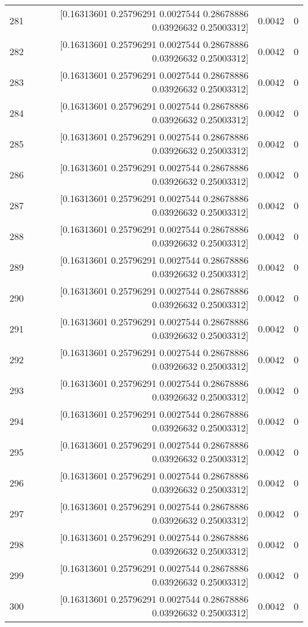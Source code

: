 \begin{longtable}{lrrr}
281 & [0.16313601 0.25796291 0.0027544  0.28678886 0.03926632 0.25003312] & 0.0042 & 0 \\
282 & [0.16313601 0.25796291 0.0027544  0.28678886 0.03926632 0.25003312] & 0.0042 & 0 \\
283 & [0.16313601 0.25796291 0.0027544  0.28678886 0.03926632 0.25003312] & 0.0042 & 0 \\
284 & [0.16313601 0.25796291 0.0027544  0.28678886 0.03926632 0.25003312] & 0.0042 & 0 \\
285 & [0.16313601 0.25796291 0.0027544  0.28678886 0.03926632 0.25003312] & 0.0042 & 0 \\
286 & [0.16313601 0.25796291 0.0027544  0.28678886 0.03926632 0.25003312] & 0.0042 & 0 \\
287 & [0.16313601 0.25796291 0.0027544  0.28678886 0.03926632 0.25003312] & 0.0042 & 0 \\
288 & [0.16313601 0.25796291 0.0027544  0.28678886 0.03926632 0.25003312] & 0.0042 & 0 \\
289 & [0.16313601 0.25796291 0.0027544  0.28678886 0.03926632 0.25003312] & 0.0042 & 0 \\
290 & [0.16313601 0.25796291 0.0027544  0.28678886 0.03926632 0.25003312] & 0.0042 & 0 \\
291 & [0.16313601 0.25796291 0.0027544  0.28678886 0.03926632 0.25003312] & 0.0042 & 0 \\
292 & [0.16313601 0.25796291 0.0027544  0.28678886 0.03926632 0.25003312] & 0.0042 & 0 \\
293 & [0.16313601 0.25796291 0.0027544  0.28678886 0.03926632 0.25003312] & 0.0042 & 0 \\
294 & [0.16313601 0.25796291 0.0027544  0.28678886 0.03926632 0.25003312] & 0.0042 & 0 \\
295 & [0.16313601 0.25796291 0.0027544  0.28678886 0.03926632 0.25003312] & 0.0042 & 0 \\
296 & [0.16313601 0.25796291 0.0027544  0.28678886 0.03926632 0.25003312] & 0.0042 & 0 \\
297 & [0.16313601 0.25796291 0.0027544  0.28678886 0.03926632 0.25003312] & 0.0042 & 0 \\
298 & [0.16313601 0.25796291 0.0027544  0.28678886 0.03926632 0.25003312] & 0.0042 & 0 \\
299 & [0.16313601 0.25796291 0.0027544  0.28678886 0.03926632 0.25003312] & 0.0042 & 0 \\
300 & [0.16313601 0.25796291 0.0027544  0.28678886 0.03926632 0.25003312] & 0.0042 & 0 \\

\end{longtable}
